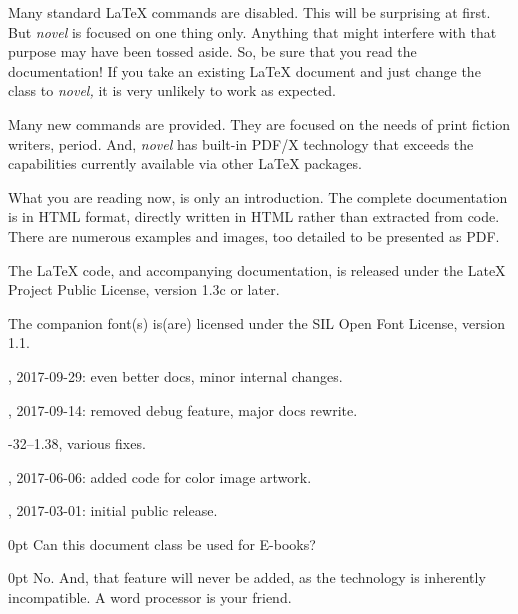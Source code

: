 \documentclass{novel} %
\begin{document}
Many standard LaTeX commands are disabled. This will be surprising at first. But \emph{novel} is focused on one thing only. Anything that might interfere with that purpose may have been tossed aside. So, be sure that you read the documentation! If you take an existing LaTeX document and just change the class to \emph{novel,} it is very unlikely to work as expected.

Many new commands are provided. They are focused on the needs of print fiction writers, period. And, \emph{novel} has built-in PDF/X technology that exceeds the capabilities currently available via other LaTeX packages.


What you are reading now, is only an introduction. The complete documentation is in HTML format, directly written in HTML rather than extracted from code. There are numerous examples and images, too detailed to be presented as PDF.


The LaTeX code, and accompanying documentation, is released under the LateX Project Public License, version 1.3c or later.

The companion font(s) is(are) licensed under the SIL Open Font License, version 1.1.




, 2017-09-29: even better docs, minor internal changes.

, 2017-09-14: removed debug feature, major docs rewrite.

-32--1.38, various fixes.

, 2017-06-06: added code for color image artwork.

, 2017-03-01: initial public release.

\clearpage


\begin{adjustwidth}{\parindent}{0pt}
\backindent{}Can this document class be used for E-books?
\end{adjustwidth}
\begin{adjustwidth}{\parindent}{0pt}
\backindent{}No. And, that feature will never be added, as the technology is inherently incompatible. A word processor is your friend.
\end{adjustwidth}
\end{document}
